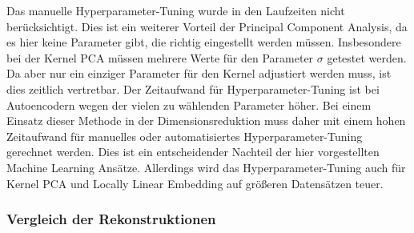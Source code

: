Das manuelle Hyperparameter-Tuning wurde in den Laufzeiten nicht berücksichtigt. Dies ist ein
weiterer Vorteil der Principal Component Analysis, da es hier keine Parameter gibt, die richtig
eingestellt werden müssen. Insbesondere bei der Kernel PCA müssen mehrere Werte für den Parameter
$\sigma$ getestet werden. Da aber nur ein einziger Parameter für den Kernel adjustiert werden muss,
ist dies zeitlich vertretbar. Der Zeitaufwand für Hyperparameter-Tuning ist bei Autoencodern wegen
der vielen zu wählenden Parameter höher. Bei einem Einsatz dieser Methode in der
Dimensionsreduktion muss daher mit einem hohen Zeitaufwand für manuelles oder automatisiertes
Hyperparameter-Tuning gerechnet werden. Dies ist ein entscheidender Nachteil der hier vorgestellten
Machine Learning Ansätze. Allerdings wird das Hyperparameter-Tuning auch für Kernel PCA und Locally
Linear Embedding auf größeren Datensätzen teuer.

\subsubsection{Vergleich der Rekonstruktionen}

